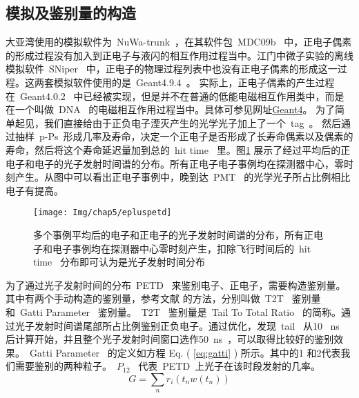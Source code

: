 \subsection{模拟及鉴别量的构造}
大亚湾使用的模拟软件为~NuWa-trunk~，在其软件包~MDC09b~ 中，正电子偶素的形成过程没有加入到正电子与液闪的相互作用过程当中。江门中微子实验的离线模拟软件~SNiper~ 中，正电子的物理过程列表中也没有正电子偶素的形成这一过程。这两套模拟软件使用的是~Geant4.9.4~。 实际上，正电子偶素的产生过程在~Geant4.0.2~ 中已经被实现，但是并不在普通的低能电磁相互作用类中，而是在一个叫做~DNA~ 的电磁相互作用过程当中。具体可参见网址\href{www.geant4.org/geant4/support/ReleaseNotes4.9.2.h}{Geant4}。
为了简单起见，我们直接给由于正负电子湮灭产生的光学光子加上了一个~tag~。 然后通过抽样~p-Ps~形成几率及寿命，决定一个正电子是否形成了长寿命偶素以及偶素的寿命，然后将这个寿命延迟量加到总的~hit time~ 里。图\ref{fig:p56} 展示了经过平均后的正电子和电子的光子发射时间谱的分布。所有正电子电子事例均在探测器中心，零时刻产生。从图中可以看出正电子事例中，晚到达~PMT~ 的光学光子所占比例相比电子有提高。
\begin{figure}[!htbp]
  \centering
   \texttt{[image: Img/chap5/epluspetd]}
    \caption{多个事例平均后的电子和正电子的光子发射时间谱的分布，所有正电子和电子事例均在探测器中心零时刻产生，扣除飞行时间后的~hit time~ 分布即可认为是光子发射时间分布}
  \label{fig:p56}
\end{figure}
为了通过光子发射时间的分布~PETD~ 来鉴别电子、正电子，需要构造鉴别量。其中有两个手动构造的鉴别量，参考文献\citep{gatti1961new} 的方法，分别叫做~T2T~ 鉴别量和~Gatti Parameter~ 鉴别量。~T2T~ 鉴别量是~Tail To Total Ratio~ 的简称。通过光子发射时间谱尾部所占比例鉴别正负电子。通过优化，发现~tail~ 从10 ~ns~ 后计算开始，并且整个光子发射时间窗口选作50~ns~，可以取得比较好的鉴别效果。~Gatti Parameter~ 的定义如方程 Eq. ( \ref{eq:gatti} ) 所示。其中的1 和2代表我们需要鉴别的两种粒子。~$P_{12}$~ 代表~PETD~上光子在该时段发射的几率。
\begin{equation}\label{eq:gatti}
G=\sum_{n}{r_{i}(t_{n}w(t_{n}))}
\end{equation}

